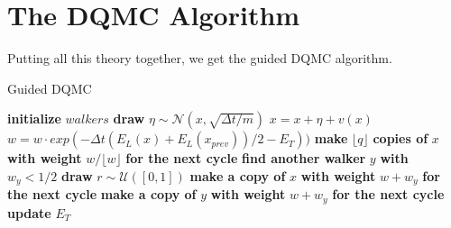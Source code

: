 \documentclass [12pt]{report}
\begin{document}
\section{The DQMC Algorithm}
Putting all this theory together, we get the guided DQMC algorithm.

\begin{algorithm}
\caption{Guided DQMC}\label{dqmc}
\begin{algorithmic}[1]
\State \textbf{initialize} $walkers$
		\State \textbf{draw} $\eta \sim \mathcal{N}(x,\sqrt{\Delta t/m})$
		\State $x = x + \eta + v(x)$ 
		\State $w = w \cdot exp(-\Delta t (E_L(x)+E_L(x_{prev}))/2 - E_T))$
		\State \textbf{make} $\lfloor q \rfloor$ \textbf{copies of} $x$ \textbf{with weight} $w/\lfloor w \rfloor$ \textbf{for the next cycle}
		\EndIf
		\State \textbf{find another walker} $y$ \textbf{with} $w_y < 1/2$
		\State \textbf{draw} $r \sim \mathcal{U}([0,1])$
		\State \textbf{make a copy of} $x$ \textbf{with weight} $w+w_y$ \textbf{for the next cycle}
		\Else
		\State \textbf{make a copy of} $y$ \textbf{with weight} $w+w_y$ \textbf{for the next cycle}
		\EndIf
		\EndIf 
	\EndFor
	\State \textbf{update} $E_T$ 
\EndFor 
\EndProcedure
\end{algorithmic}
\end{algorithm}
\newpage
\end{document}
